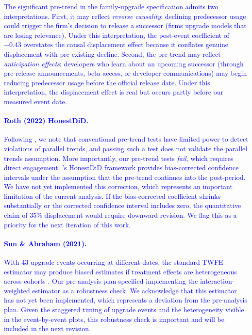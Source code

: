 \documentclass[11pt, a4paper]{article}
\begin{document}
\textcolor{blue}{The significant pre-trend in the family-upgrade specification admits two interpretations. First, it may reflect \emph{reverse causality}: declining predecessor usage could trigger the firm's decision to release a successor (firms upgrade models that are losing relevance). Under this interpretation, the post-event coefficient of $-0.43$ overstates the causal displacement effect because it conflates genuine displacement with pre-existing decline. Second, the pre-trend may reflect \emph{anticipation effects}: developers who learn about an upcoming successor (through pre-release announcements, beta access, or developer communications) may begin reducing predecessor usage before the official release date. Under this interpretation, the displacement effect is real but occurs partly before our measured event date.}

\textcolor{blue}{\paragraph{Roth (2022) HonestDiD.} Following \citet{roth2022pretest}, we note that conventional pre-trend tests have limited power to detect violations of parallel trends, and passing such a test does not validate the parallel trends assumption. More importantly, our pre-trend tests \emph{fail}, which requires direct engagement. \citet{roth2022pretest}'s HonestDiD framework provides bias-corrected confidence intervals under the assumption that the pre-trend continues into the post-period. We have not yet implemented this correction, which represents an important limitation of the current analysis. If the bias-corrected coefficient shrinks substantially or the corrected confidence interval includes zero, the quantitative claim of 35\% displacement would require downward revision. We flag this as a priority for the next iteration of this work.}

\textcolor{blue}{\paragraph{Sun \& Abraham (2021).} With 43 upgrade events occurring at different dates, the standard TWFE estimator may produce biased estimates if treatment effects are heterogeneous across cohorts \citep{dechaisemartin2020twoway, goodmanbacon2021}. Our pre-analysis plan specified implementing the \citet{sunAbraham2021} interaction-weighted estimator as a robustness check. We acknowledge that this estimator has not yet been implemented, which represents a deviation from the pre-analysis plan. Given the staggered timing of upgrade events and the heterogeneity visible in the event-by-event plots, this robustness check is important and will be included in the next revision.}
\end{document}
